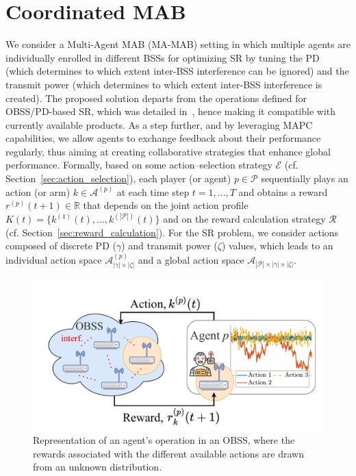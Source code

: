 \section{Coordinated MAB}
\label{sec:solution}

We consider a Multi-Agent MAB (MA-MAB) setting in which multiple agents are individually enrolled in different BSSs for optimizing SR by tuning the PD (which determines to which extent inter-BSS interference can be ignored) and the transmit power (which determines to which extent inter-BSS interference is created). The proposed solution departs from the operations defined for OBSS/PD-based SR, which was detailed in~\cite{wilhelmi2021spatial}, hence making it compatible with currently available products. As a step further, and by leveraging MAPC capabilities, we allow agents to exchange feedback about their performance regularly, thus aiming at creating collaborative strategies that enhance global performance. Formally, based on some action--selection strategy $\mathcal{E}$ (cf. Section~\ref{sec:action_selection}), each player (or agent) $p\in \mathcal{P}$ sequentially plays an action (or arm) $k\in \mathcal{A}^{(p)}$ at each time step $t=1,...,T$ and obtains a reward $r^{(p)}(t+1) \in \mathbb{R}$ that depends on the joint action profile $K(t)= \{k^{(1)}(t), ..., k^{(|\mathcal{P}|)}(t)\}$ and on the reward calculation strategy $\mathcal{R}$ (cf. Section~\ref{sec:reward_calculation}). For the SR problem, we consider actions composed of discrete PD ($\gamma$) and transmit power ($\zeta$) values, which leads to an individual action space $\mathcal{A}^{(p)}_{|\gamma|\times|\zeta|}$ and a global action space $\mathcal{A}_{|\mathcal{P}|\times|\gamma|\times |\zeta|}$.

\begin{figure}[ht!]
    \centering
    \includegraphics[width=0.8\columnwidth]{figures/agents_operation.pdf}
    \caption{Representation of an agent's operation in an OBSS, where the rewards associated with the different available actions are drawn from an unknown distribution.}
    \label{fig:agents_operation}
\end{figure}


